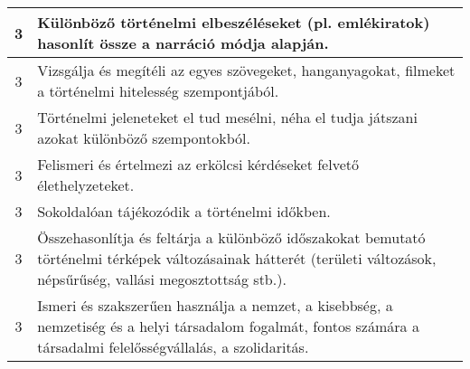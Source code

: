 \begin{longtable}{c | p{12cm} }
                                          3 &  Különböző történelmi elbeszéléseket (pl. emlékiratok) hasonlít össze a narráció módja alapján. \\ \hline
                                          3 &  Vizsgálja és megítéli az egyes szövegeket, hanganyagokat, filmeket a történelmi hitelesség szempontjából. \\ \hline
                                          3 &  Történelmi jeleneteket el tud mesélni, néha el tudja játszani azokat különböző szempontokból. \\ \hline
                                          3 &  Felismeri és értelmezi az erkölcsi kérdéseket felvető élethelyzeteket. \\ \hline
                                          3 &  Sokoldalóan tájékozódik a történelmi időkben. \\ \hline
                                          3 &  Összehasonlítja és feltárja a különböző időszakokat bemutató történelmi térképek változásainak hátterét (területi változások, népsűrűség, vallási megosztottság stb.). \\ \hline
                                          3 &  Ismeri és szakszerűen használja a nemzet, a kisebbség, a nemzetiség és a helyi társadalom fogalmát, fontos számára a társadalmi felelősségvállalás, a szolidaritás. \\ \hline
                                      

\end{longtable}
